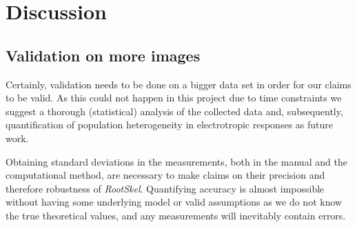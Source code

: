 
\chapter{Discussion} %

\label{discussion} %

%





\section{Validation on more images}\label{sec:validation}


Certainly, validation needs to be done on a bigger data set in order for our claims to be valid.
As this could not happen in this project due to time constraints we suggest a thorough (statistical) analysis of the collected data and, subsequently, quantification of population heterogeneity in electrotropic responses as future work.

Obtaining standard deviations in the measurements, both in the manual and the computational method, are necessary to make claims on their precision and therefore robustness of \textit{RootSkel}. Quantifying accuracy is almost impossible without having some underlying model or valid assumptions as we do not know the true theoretical values, and any measurements will inevitably contain errors. 


